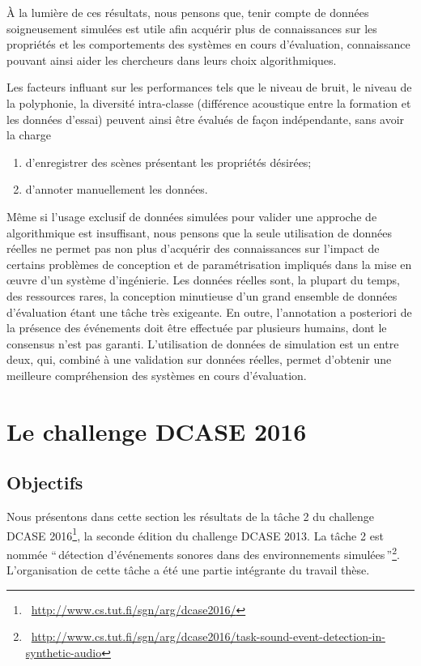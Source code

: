 À la lumière de ces résultats, nous pensons que, tenir compte de données soigneusement simulées est utile afin acquérir plus de connaissances sur les propriétés et les comportements des systèmes en cours d'évaluation, connaissance pouvant ainsi aider les chercheurs dans leurs choix algorithmiques. 

Les facteurs influant sur les performances tels que le niveau de bruit, le niveau de la polyphonie, la diversité intra-classe (différence acoustique entre la formation et les données d'essai) peuvent ainsi être évalués de façon indépendante, sans avoir la charge 

\begin{enumerate}
\item d'enregistrer des scènes présentant les propriétés désirées;
\item d'annoter manuellement les données.
\end{enumerate}

Même si l'usage exclusif de données simulées pour valider une approche de algorithmique est insuffisant, nous pensons que la seule utilisation de données réelles ne permet pas non plus d'acquérir des connaissances sur l'impact de certains problèmes de conception et de paramétrisation impliqués dans la mise en œuvre d'un système d'ingénierie. Les données réelles sont, la plupart du temps, des ressources rares, la conception minutieuse d'un grand ensemble de données d'évaluation étant une tâche très exigeante. En outre,  l'annotation a posteriori de la présence des événements doit être effectuée par plusieurs humains, dont le consensus n'est pas garanti. L'utilisation de données de simulation est un entre deux, qui, combiné à une validation sur données réelles, permet d'obtenir une meilleure compréhension des systèmes en cours d'évaluation. 

\section{Le challenge DCASE  2016}

\subsection{Objectifs}

Nous présentons dans cette section les résultats de la tâche 2 du challenge DCASE 2016\footnote{\cf~\url{http://www.cs.tut.fi/sgn/arg/dcase2016/}}, la seconde édition du challenge DCASE 2013. La tâche 2 est nommée ``\,détection d'événements sonores dans des environnements simulées\,''\footnote{\cf~\url{http://www.cs.tut.fi/sgn/arg/dcase2016/task-sound-event-detection-in-synthetic-audio}}. L'organisation de cette tâche a été une partie intégrante du travail thèse. 

